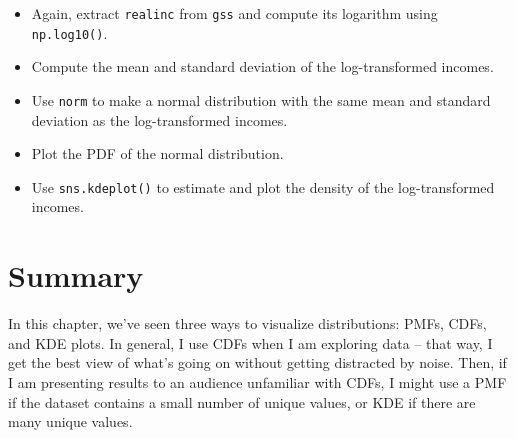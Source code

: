 \begin{itemize}
\item
  Again, extract \passthrough{\lstinline!realinc!} from
  \passthrough{\lstinline!gss!} and compute its logarithm using
  \passthrough{\lstinline!np.log10()!}.
\item
  Compute the mean and standard deviation of the log-transformed
  incomes.
\item
  Use \passthrough{\lstinline!norm!} to make a normal distribution with
  the same mean and standard deviation as the log-transformed incomes.
\item
  Plot the PDF of the normal distribution.
\item
  Use \passthrough{\lstinline!sns.kdeplot()!} to estimate and plot the
  density of the log-transformed incomes.
\end{itemize}

\section{Summary}\label{summary}

In this chapter, we've seen three ways to visualize distributions: PMFs,
CDFs, and KDE plots. In general, I use CDFs when I am exploring data --
that way, I get the best view of what's going on without getting
distracted by noise. Then, if I am presenting results to an audience
unfamiliar with CDFs, I might use a PMF if the dataset contains a small
number of unique values, or KDE if there are many unique values.

